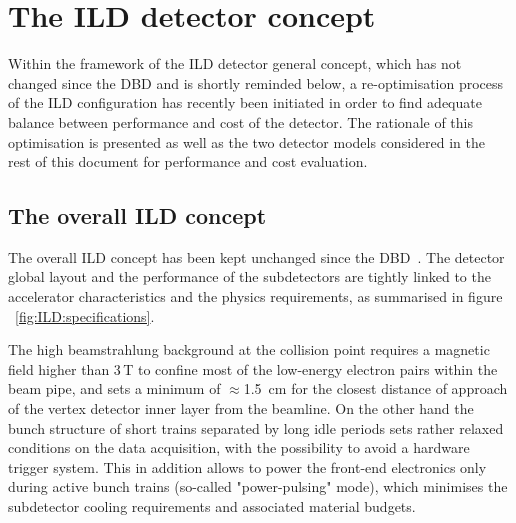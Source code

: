 \chapter{The ILD detector concept}
\label{chap:ILD}

Within the framework of the ILD detector general concept, which has not changed since the DBD and is shortly reminded below, a re-optimisation process of the ILD configuration has recently been initiated in order to find adequate balance between performance and cost of the detector. The rationale of this optimisation is presented as well as the two detector models considered in the rest of this document for performance and cost evaluation. 

\section{The overall ILD concept}

The overall ILD concept has been kept unchanged since the DBD~\cite{ild:bib:ilddbd}. The detector global layout and the performance of the subdetectors are tightly linked to the accelerator characteristics and the physics requirements, as summarised in figure ~\ref{fig:ILD:specifications}. 

The high beamstrahlung background at the collision point requires a magnetic field higher than 3\,T to confine most of the low-energy electron pairs  within the beam pipe, and sets a minimum of $\approx$1.5~cm for the closest distance of approach of the vertex detector inner layer from the beamline. On the other hand the bunch structure of short trains separated by long idle periods sets rather relaxed conditions on the data acquisition, with the possibility to avoid a hardware trigger system. This in addition allows to power the front-end electronics only during active bunch trains (so-called "power-pulsing" mode), which minimises the subdetector cooling requirements and associated material budgets.  

